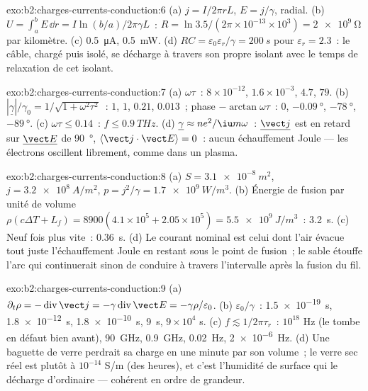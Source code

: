 \begin{solution}{exo:b2:charges-currents-conduction:6}
(a) $j = I/2\pi rL$, $E = j/\gamma$, radial. (b) $U = \int_a^bE\,\dd r = I\ln(b/a)/
2\pi\gamma L$~: $R = \ln3.5/(2\pi \times 10^{-13} \times 10^3) = \qty{2e9}{\ohm}$ par kilomètre.
(c) \qty{0.5}{\micro A}, \qty{0.5}{mW}. (d) $RC = \varepsilon_0\varepsilon_r/\gamma = \qty{200}{s}$ pour
$\varepsilon_r = 2.3$~: le câble, chargé puis isolé, se décharge à travers son propre
isolant avec le temps de relaxation de cet isolant.
\end{solution}

\begin{solution}{exo:b2:charges-currents-conduction:7}
(a) $\omega\tau$~: $8 \times 10^{-12}$, $1.6 \times 10^{-3}$, $4.7$, $79$. (b) $|\underline\gamma|/\gamma_0 =
1/\sqrt{1 + \omega^2\tau^2}$~: $1$, $1$, $0.21$, $0.013$~; phase $-\arctan\omega\tau$~: $0$,
$-\qty{0.09}{\degree}$, $-\qty{78}{\degree}$, $-\qty{89}{\degree}$. (c) $\omega\tau \le 0.14$~: $f \le
\qty{0.9}{THz}$. (d) $\underline\gamma \approx ne^2/\iu m\omega$~: $\underline{\vect j}$ est en retard sur
$\underline{\vect E}$ de \qty{90}{\degree}, $\langle\vect j\cdot\vect E\rangle = 0$~: aucun échauffement
Joule --- les électrons oscillent librement, comme dans un plasma.
\end{solution}

\begin{solution}{exo:b2:charges-currents-conduction:8}
(a) $S = \qty{3.1e-8}{m^2}$, $j = \qty{3.2e8}{A/m^2}$, $p = j^2/\gamma = \qty{1.7e9}{W/m^3}$.
(b) Énergie de fusion par unité de volume $\rho(c\Delta T + L_f) = 8900(4.1 \times 10^5 + 2.05 \times
10^5) = \qty{5.5e9}{J/m^3}$~: \qty{3.2}{s}. (c) Neuf fois plus vite~: \qty{0.36}{s}. (d) Le
courant nominal est celui dont l'air évacue tout juste l'échauffement Joule
en restant sous le point de fusion~; le sable étouffe l'arc qui
continuerait sinon de conduire à travers l'intervalle après la fusion du fil.
\end{solution}

\begin{solution}{exo:b2:charges-currents-conduction:9}
(a) $\partial_t\rho = -\operatorname{div}\vect j = -\gamma\operatorname{div}\vect E = -\gamma\rho/
\varepsilon_0$. (b) $\varepsilon_0/\gamma$~: \qty{1.5e-19}{s}, \qty{1.8e-12}{s}, \qty{1.8e-10}{s},
\qty{9}{s}, $9 \times 10^4$ s. (c) $f \lesssim 1/2\pi\tau_r$~: $10^{18}$ Hz (le 
tombe en défaut bien avant), \qty{90}{GHz}, \qty{0.9}{GHz}, \qty{0.02}{Hz}, \qty{2e-6}{Hz}. (d)
Une baguette de verre perdrait sa charge en une minute par son volume~;
le verre sec réel est plutôt à $10^{-14}$ S/m (des heures), et c'est l'humidité
de surface qui le décharge d'ordinaire --- cohérent en ordre de
grandeur.
\end{solution}

